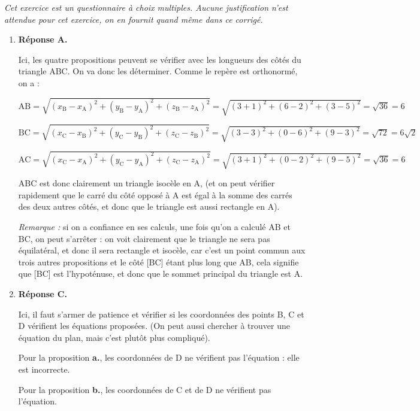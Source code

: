 \medskip

\emph{Cet exercice est un questionnaire à choix multiples. Aucune justification n'est attendue pour cet exercice, on en fournit quand même dans ce corrigé.}

\medskip

\begin{enumerate}
	\item \textbf{Réponse A.}

Ici, les quatre propositions peuvent se vérifier avec les longueurs des côtés du triangle ABC. On va donc les déterminer. Comme le repère est orthonormé, on a :

$\mathrm{AB} = \sqrt{(x_\mathrm{B} - x_\mathrm{A})^2+(y_\mathrm{B} - y_\mathrm{A})^2+(z_\mathrm{B} - z_\mathrm{A})^2} = \sqrt{(3 + 1)^2 + (6-2)^2 + (3 - 5)^2} = \sqrt{36}=6$

$\mathrm{BC} = \sqrt{(x_\mathrm{C} - x_\mathrm{B})^2+(y_\mathrm{C} - y_\mathrm{B})^2+(z_\mathrm{C} - z_\mathrm{B})^2} = \sqrt{(3-3)^2 + (0-6)^2 + (9-3)^2} = \sqrt{72}=6\sqrt{2}$

$\mathrm{AC} = \sqrt{(x_\mathrm{C} - x_\mathrm{A})^2+(y_\mathrm{C} - y_\mathrm{A})^2+(z_\mathrm{C} - z_\mathrm{A})^2} = \sqrt{(3 + 1)^2 + (0-2)^2 + (9 - 5)^2} = \sqrt{36}=6$

ABC est donc clairement un triangle isocèle en A, (et on peut vérifier rapidement que le carré du côté opposé à A est égal à la somme des carrés des deux autres côtés, et donc que le triangle est aussi rectangle en A).

\emph{Remarque :} si on a confiance en ses calculs, une fois qu'on a calculé AB et BC, on peut s'arrêter : on voit clairement que le triangle ne sera pas équilatéral, et donc il sera rectangle et isocèle, car c'est un point commun aux trois autres propositions et le côté [BC] étant plus long que AB, cela signifie que [BC] est l'hypoténuse, et donc que le sommet principal du triangle est A.

	\item \textbf{Réponse C.}

Ici, il faut s'armer de patience et vérifier si les coordonnées des points B, C et D vérifient les équations proposées. (On peut aussi chercher à trouver une équation du plan, mais c'est plutôt plus compliqué).

Pour la proposition \textbf{a.}, les coordonnées de D ne vérifient pas l'équation : elle est incorrecte.

Pour la proposition \textbf{b.}, les coordonnées de C et de D ne vérifient pas l'équation.


\end{enumerate}
